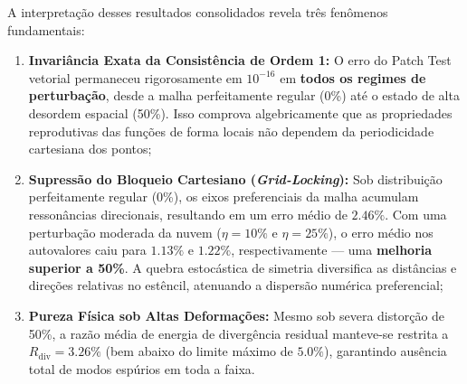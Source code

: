 \documentclass[11pt,a4paper]{article}
\begin{document}
\begin{table}[H]
\centering
\caption{Desempenho estat\'istico do VNMM 2D sob perturba\c{c}\~ao estoc\'astica nodal de at\'e 50\% de deforma\c{c}\~ao.}
\label{tab:jitter}
\end{table}

A interpreta\c{c}\~ao desses resultados consolidados revela tr\^es fen\^omenos fundamentais:
\begin{enumerate}
  \item \textbf{Invari\^ancia Exata da Consist\^encia de Ordem 1:} O erro do Patch Test vetorial permaneceu rigorosamente em $10^{-16}$ em \textbf{todos os regimes de perturba\c{c}\~ao}, desde a malha perfeitamente regular (0\%) at\'e o estado de alta desordem espacial (50\%). Isso comprova algebricamente que as propriedades reprodutivas das fun\c{c}\~oes de forma locais n\~ao dependem da periodicidade cartesiana dos pontos;
  \item \textbf{Supress\~ao do Bloqueio Cartesiano (\textit{Grid-Locking}):} Sob distribui\c{c}\~ao perfeitamente regular (0\%), os eixos preferenciais da malha acumulam resson\^ancias direcionais, resultando em um erro m\'edio de $2.46\%$. Com uma perturba\c{c}\~ao moderada da nuvem ($\eta = 10\%$ e $\eta = 25\%$), o erro m\'edio nos autovalores caiu para $\mathbf{1.13\%}$ e $\mathbf{1.22\%}$, respectivamente --- uma \textbf{melhoria superior a 50\%}. A quebra estoc\'astica de simetria diversifica as dist\^ancias e dire\c{c}\~oes relativas no est\^encil, atenuando a dispers\~ao num\'erica preferencial;
  \item \textbf{Pureza F\'isica sob Altas Deforma\c{c}\~oes:} Mesmo sob severa distor\c{c}\~ao de 50\%, a raz\~ao m\'edia de energia de diverg\^encia residual manteve-se restrita a $R_{\mathrm{div}} = 3.26\%$ (bem abaixo do limite m\'aximo de $5.0\%$), garantindo aus\^encia total de modos esp\'urios em toda a faixa.
\end{enumerate}
\end{document}
